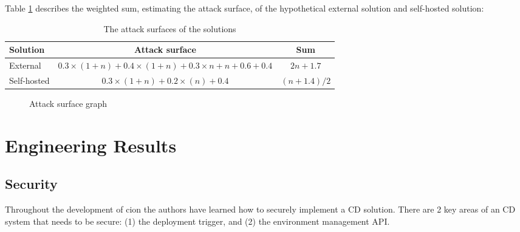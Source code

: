 Table \ref{tab:result1} describes the weighted sum, estimating the attack surface, of the hypothetical external solution and self-hosted solution:
\begin{table}[ht]
    \begin{tabularx}{\textwidth}{|X|c|c|}
        \hline
        \textbf{Solution}  & \textbf{Attack surface} & \textbf{Sum}\\ \hline \hline
        External           & $0.3\times(1+n) + 0.4\times(1+n) + 0.3\times n + n + 0.6 + 0.4$ & $2n + 1.7$\\ \hline
        Self-hosted        & $0.3\times(1+n) + 0.2\times(n) + 0.4$ & $(n + 1.4)/2$\\ \hline
    \end{tabularx}
    \caption{The attack surfaces of the solutions}
    \label{tab:result1}
\end{table}

\begin{center}
    \begin{figure}
        \caption{Attack surface graph}
        \label{fig:my_label}
    \end{figure}
\end{center}

\section{Engineering Results}
\label{subsec:engineering}
\subsection{Security}
Throughout the development of cion the authors have learned how to securely implement a \acrshort{CD} solution. There are 2 key areas of an \acrshort{CD} system that needs to be secure: (1) the deployment trigger, and (2) the environment management \acrshort{API}.

